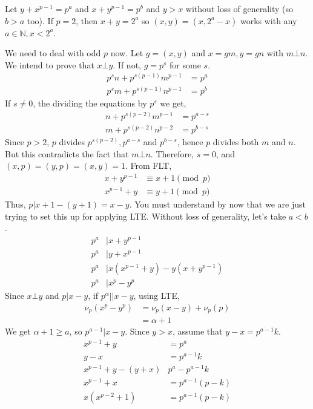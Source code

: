 \documentclass[problems.tex]{subfile}
\begin{document}
	\begin{solution}
		Let $y+x^{p-1}=p^a$ and $x+y^{p-1}=p^b$ and $y>x$ without loss of generality (so $b>a$ too). If $p=2$, then $x+y=2^a$ so $(x,y)=(x,2^a-x)$ works with any $a\in\mathbb{N},x<2^a$.
		
		We need to deal with odd $p$ now. Let $g=(x,y)$ and $x=gm,y=gn$ with $m\bot n$. We intend to prove that $x\bot y$. If not, $g=p^s$ for some $s$.
			\begin{align*}
				p^sn+p^{s(p-1)}m^{p-1} & = p^a\\
				p^sm+p^{s(p-1)}n^{p-1} & = p^b
			\end{align*}
		If $s\neq0$, the dividing the equations by $p^s$ we get,
			\begin{align*}
				n+p^{s(p-2)}m^{p-1} & = p^{a-s}\\
				m+p^{s(p-2)}n^{p-2} & = p^{b-s}
			\end{align*}
		Since $p>2$, $p$ divides $p^{s(p-2)},p^{a-s}$ and $p^{b-s}$, hence $p$ divides both $m$ and $n$. But this contradicts the fact that $m\bot n$. Therefore, $s=0$, and $(x,p)=(y,p)=(x,y)=1$. From FLT,
			\begin{align*}
				x+y^{p-1}&\equiv x+1\pmod p\\
				x^{p-1}+y&\equiv y+1\pmod p
			\end{align*}
		Thus, $p|x+1-(y+1)=x-y$. You must understand by now that we are just trying to set this up for applying LTE. Without loss of generality, let's take $a<b$.
			\begin{align*}
				p^a& |x+y^{p-1}\\
				p^a& |y+x^{p-1}\\
				p^a& |x(x^{p-1}+y)-y(x+y^{p-1})\\
				p^a& |x^p-y^p
			\end{align*}
		Since $x\bot y$ and $p|x-y$, if $p^\alpha ||x-y$, using LTE,
			\begin{align*}
				\nu_p(x^p-y^p)  & = \nu_p(x-y)+\nu_p(p)\\
								& = \alpha +1
			\end{align*}
		We get $\alpha +1\geq a$, so $p^{a-1}|x-y$. Since $y>x$, assume that $y-x=p^{a-1}k$.
			\begin{align*}
				x^{p-1}+y & = p^a\\
				y-x & = p^{a-1}k\\
				x^{p-1}+y-(y+x) & p^a-p^{a-1}k\\
				x^{p-1}+x & = p^{a-1}(p-k)\\
				x(x^{p-2}+1) & = p^{a-1}(p-k)
			\end{align*}

\end{solution}
\end{document}
